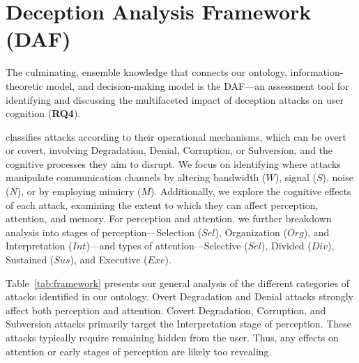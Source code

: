 \section{\MR Deception Analysis Framework (DAF)}
\label{sec:cog-framework}
The culminating, ensemble knowledge that connects our ontology, information-theoretic model, and decision-making model is the \MR \acf{DAF}---an assessment tool for identifying and discussing the multifaceted impact of \MR deception attacks on user cognition (\textbf{RQ4}).


\DAF classifies attacks according to their operational mechanisms, which can be overt or covert, involving Degradation, Denial, Corruption, or Subversion, and the cognitive processes they aim to disrupt. 
We focus on identifying where attacks manipulate \MR communication channels by altering bandwidth ($W$), signal ($S$), noise ($N$), or by employing mimicry ($M$). Additionally, we explore the cognitive effects of each attack, examining the extent to which they can affect perception, attention, and memory.
For perception and attention, we further breakdown analysis into stages of perception---Selection ($Sel$), Organization ($Org$), and Interpretation ($Int$)---and types of attention---Selective ($Sel$), Divided ($Div$), Sustained ($Sus$), and Executive ($Exe$).

Table~\ref{tab:framework} presents our general analysis of the different categories of attacks identified in our ontology.
Overt Degradation and Denial attacks strongly affect both perception and attention.
Covert Degradation, Corruption, and Subversion attacks primarily target the Interpretation stage of perception.
These attacks typically require remaining hidden from the user.
Thus, any effects on attention or early stages of perception are likely too revealing.


